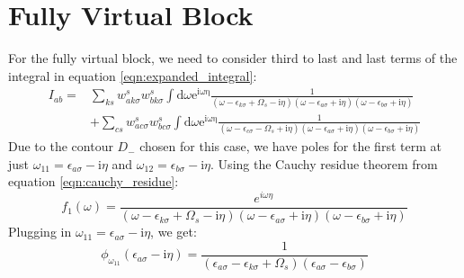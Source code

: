 \documentclass[12pt]{caltech_thesis}
\begin{document}
\section{Fully Virtual Block}
For the fully virtual block, we need to consider third to last and last terms of the integral in equation \ref{eqn:expanded_integral}:
\begin{equation}
\begin{aligned}
I_{ab} =& \sum_{ks} w_{a k \sigma}^s w_{b k \sigma}^s \int \mathrm{d} \omega \mathrm{e}^{\mathrm{i \omega \eta}} \frac{1}{(\omega-\epsilon_{k \sigma}+\Omega_s-\mathrm{i} \eta)(\omega-\epsilon_{a \sigma}+\mathrm{i} \eta)(\omega-\epsilon_{b \sigma}+\mathrm{i} \eta)}\\
& + \sum_{cs} w_{a c \sigma}^s w_{b c \sigma}^s \int \mathrm{d} \omega \mathrm{e}^{\mathrm{i \omega \eta}} \frac{1}{(\omega-\epsilon_{c \sigma}-\Omega_s+\mathrm{i} \eta)(\omega-\epsilon_{a \sigma}+\mathrm{i} \eta)(\omega-\epsilon_{b \sigma}+\mathrm{i} \eta)}
\end{aligned}
\end{equation}
Due to the contour $D_-$ chosen for this case, we have poles for the first term at just $\omega_{11} = \epsilon _{a \sigma } - \mathrm{i} \eta$ and $\omega_{12} = \epsilon _{b \sigma } - \mathrm{i} \eta$. Using the Cauchy residue theorem from equation \ref{eqn:cauchy_residue}:
\begin{equation}
f_1(\omega) = \frac{e^{i\omega \eta }}{(\omega-\epsilon_{k \sigma}+\Omega_s-\mathrm{i} \eta)(\omega-\epsilon_{a \sigma}+\mathrm{i} \eta)(\omega-\epsilon_{b \sigma}+\mathrm{i} \eta)}
\end{equation}
Plugging in $\omega_{11} = \epsilon _{a \sigma } - \mathrm{i} \eta$, we get:
\begin{equation}
\phi_{\omega_{11}}(\epsilon_{a \sigma} - \mathrm{i} \eta) = \frac{1}{(\epsilon_{a \sigma} -\epsilon_{k \sigma}+\Omega_s)(\epsilon_{a \sigma} -\epsilon_{b \sigma})}
\end{equation}
\end{document}
